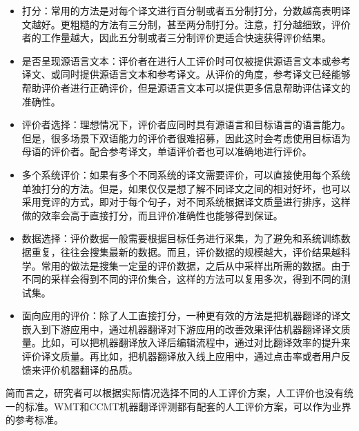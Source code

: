 \begin{itemize}
\vspace{0.5em}
\item 打分：常用的方法是对每个译文进行百分制或者五分制打分，分数越高表明译文越好。更粗糙的方法有三分制，甚至两分制打分。注意，打分越细致，评价者的工作量越大，因此五分制或者三分制评价更适合快速获得评价结果。
\vspace{0.5em}
\item 是否呈现源语言文本：评价者在进行人工评价时可仅被提供源语言文本或参考译文、或同时提供源语言文本和参考译文。从评价的角度，参考译文已经能够帮助评价者进行正确评价，但是源语言文本可以提供更多信息帮助评估译文的准确性。
\vspace{0.5em}
\item 评价者选择：理想情况下，评价者应同时具有源语言和目标语言的语言能力。但是，很多场景下双语能力的评价者很难招募，因此这时会考虑使用目标语为母语的评价者。配合参考译文，单语评价者也可以准确地进行评价。
\vspace{0.5em}
\item 多个系统评价：如果有多个不同系统的译文需要评价，可以直接使用每个系统单独打分的方法。但是，如果仅仅是想了解不同译文之间的相对好坏，也可以采用竞评的方式，即对于每个句子，对不同系统根据译文质量进行排序，这样做的效率会高于直接打分，而且评价准确性也能够得到保证。
\vspace{0.5em}
\item 数据选择：评价数据一般需要根据目标任务进行采集，为了避免和系统训练数据重复，往往会搜集最新的数据。而且，评价数据的规模越大，评价结果越科学。常用的做法是搜集一定量的评价数据，之后从中采样出所需的数据。由于不同的采样会得到不同的评价集合，这样的方法可以复用多次，得到不同的测试集。
\vspace{0.5em}
\item 面向应用的评价：除了人工直接打分，一种更有效的方法是把机器翻译的译文嵌入到下游应用中，通过机器翻译对下游应用的改善效果评估机器翻译译文质量。比如，可以把机器翻译放入译后编辑流程中，通过对比翻译效率的提升来评价译文质量。再比如，把机器翻译放入线上应用中，通过点击率或者用户反馈来评价机器翻译的品质。
\vspace{0.5em}
\end{itemize}

\parinterval 简而言之，研究者可以根据实际情况选择不同的人工评价方案，人工评价也没有统一的标准。WMT和CCMT机器翻译评测都有配套的人工评价方案，可以作为业界的参考标准。


